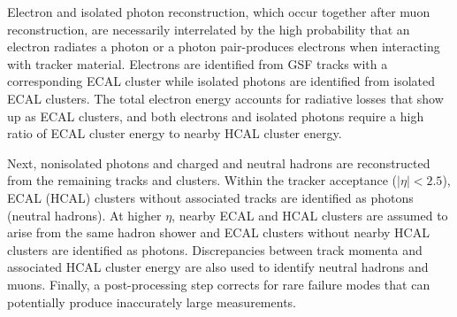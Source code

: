Electron and isolated photon reconstruction, which occur together after muon reconstruction, are necessarily interrelated by the high probability that an electron radiates a photon or a photon pair-produces electrons when interacting with tracker material. Electrons are identified from GSF tracks with a corresponding ECAL cluster while isolated photons are identified from isolated ECAL clusters. The total electron energy accounts for radiative losses that show up as ECAL clusters, and both electrons and isolated photons require a high ratio of ECAL cluster energy to nearby HCAL cluster energy.

Next, nonisolated photons and charged and neutral hadrons are reconstructed from the remaining tracks and clusters. Within the tracker acceptance ($|\eta|<2.5$), ECAL (HCAL) clusters without associated tracks are identified as photons (neutral hadrons). At higher $\eta$, nearby ECAL and HCAL clusters are assumed to arise from the same hadron shower and ECAL clusters without nearby HCAL clusters are identified as photons. Discrepancies between track momenta and associated HCAL cluster energy are also used to identify neutral hadrons and muons. Finally, a post-processing step corrects for rare failure modes that can potentially produce inaccurately large \ptmiss measurements.



\pagebreak